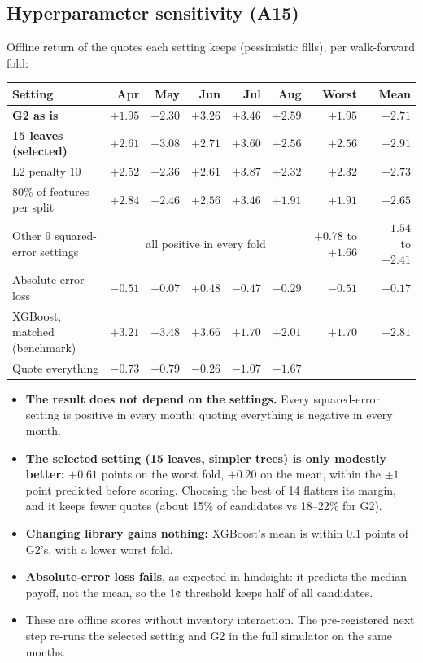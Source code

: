 \documentclass[11pt,a4paper]{article}
\newcommand{\cent}{\text{\textcent}}
\begin{document}
\subsection{Hyperparameter sensitivity (A15)}
Offline return of the quotes each setting keeps (pessimistic fills), per walk-forward fold:

\begin{center}
\small
\setlength{\tabcolsep}{4pt}
\begin{tabular}{l r r r r r r r}
\toprule
Setting & Apr & May & Jun & Jul & Aug & \textbf{Worst} & Mean \\
\midrule
\textbf{G2 as is} & $+1.95$ & $+2.30$ & $+3.26$ & $+3.46$ & $+2.59$ & $\mathbf{+1.95}$ & $+2.71$ \\
\textbf{15 leaves (selected)} & $+2.61$ & $+3.08$ & $+2.71$ & $+3.60$ & $+2.56$ & $\mathbf{+2.56}$ & $+2.91$ \\
L2 penalty 10 & $+2.52$ & $+2.36$ & $+2.61$ & $+3.87$ & $+2.32$ & $+2.32$ & $+2.73$ \\
80\% of features per split & $+2.84$ & $+2.46$ & $+2.56$ & $+3.46$ & $+1.91$ & $+1.91$ & $+2.65$ \\
Other 9 squared-error settings & \multicolumn{5}{c}{all positive in every fold} & $+0.78$ to $+1.66$ & $+1.54$ to $+2.41$ \\
Absolute-error loss & $-0.51$ & $-0.07$ & $+0.48$ & $-0.47$ & $-0.29$ & $-0.51$ & $-0.17$ \\
XGBoost, matched (benchmark) & $+3.21$ & $+3.48$ & $+3.66$ & $+1.70$ & $+2.01$ & $+1.70$ & $+2.81$ \\
\midrule
Quote everything & $-0.73$ & $-0.79$ & $-0.26$ & $-1.07$ & $-1.67$ & & \\
\bottomrule
\end{tabular}
\end{center}

\begin{itemize}
  \item \textbf{The result does not depend on the settings.} Every squared-error setting is positive in every
        month; quoting everything is negative in every month.
  \item \textbf{The selected setting (15 leaves, simpler trees) is only modestly better:} $+0.61$ points on the
        worst fold, $+0.20$ on the mean, within the $\pm1$ point predicted before scoring. Choosing the best of 14
        flatters its margin, and it keeps fewer quotes (about 15\% of candidates vs 18--22\% for G2).
  \item \textbf{Changing library gains nothing:} XGBoost's mean is within $0.1$ points of G2's, with a lower worst
        fold.
  \item \textbf{Absolute-error loss fails}, as expected in hindsight: it predicts the median payoff, not the mean,
        so the $1\cent$ threshold keeps half of all candidates.
  \item These are offline scores without inventory interaction. The pre-registered next step re-runs the selected
        setting and G2 in the full simulator on the same months.
\end{itemize}
\end{document}
